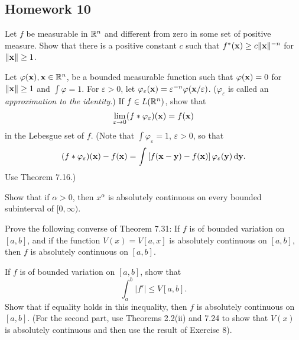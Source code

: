 \subsection{Homework 10}
\begin{problem}
Let $f$ be measurable in $\mathbb{R}^n$ and different from zero in some set of
positive measure. Show that there is a positive constant $c$ such that
$f^*(\mathbf{x})\geq c\|\mathbf{x}\|^{-n}$ for $\|\mathbf{x}\|\geq 1$.
\end{problem}
\begin{solution}
\end{solution}

\begin{problem}
Let $\varphi(\mathbf{x}),\mathbf{x}\in\mathbb{R}^n$, be a bounded measurable function such
that $\varphi(\mathbf{x})=0$ for $\|\mathbf{x}\|\geq 1$ and $\int\varphi=1$. For
$\varepsilon>0$, let
$\varphi_\varepsilon(\mathbf{x})=\varepsilon^{-n}\varphi(\mathbf{x}/\varepsilon)$. ($\varphi_\varepsilon$
is called an \emph{approximation to the identity}.) If $f\in L(\mathbb{R}^n)$,
show that
\[
\lim_{\varepsilon\to 0}(f*\varphi_\varepsilon)(\mathbf{x})=f(\mathbf{x})
\]
in the Lebesgue set of $f$. (Note that $\int\varphi_\varepsilon=1$,
$\varepsilon>0$, so that
\[
(f*\varphi_\varepsilon)(\mathbf{x})-f(\mathbf{x})=\int\left[f(\mathbf{x}-\mathbf{y})-f(\mathbf{x})\right]\varphi_\varepsilon(\mathbf{y})\mathop{}\!\mathrm{d}\mathbf{y}.
\]
Use Theorem 7.16.)
\end{problem}
\begin{solution}
\end{solution}

\begin{problem}
Show that if $\alpha>0$, then $x^\alpha$ is absolutely continuous on every
bounded subinterval of $[0,\infty)$.
\end{problem}
\begin{solution}
\end{solution}

\begin{problem}
Prove the following converse of Theorem 7.31: If $f$ is of bounded
variation on $[a,b]$, and if the function $V(x)=V[a,x]$ is absolutely
continuous on $[a,b]$, then $f$ is absolutely continuous on $[a,b]$.
\end{problem}
\begin{solution}
\end{solution}

\begin{problem}
If $f$ is of bounded variation on $[a,b]$, show that
\[
\int_a^b|f'|\leq V[a,b].
\]
Show that if equality holds in this inequality, then $f$ is absolutely
continuous on $[a,b]$. (For the second part, use Theorems 2.2(ii) and 7.24
to show that $V(x)$ is absolutely continuous and then use the result of
Exercise 8).
\end{problem}
\begin{solution}
\end{solution}

